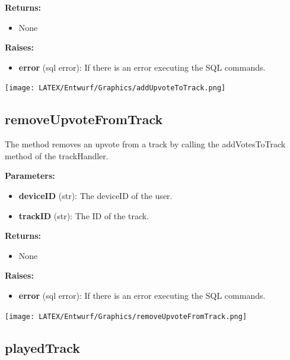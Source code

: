\documentclass[oneside, ngerman]{sdqtechreport}
\begin{document}
\textbf{Returns:}

\begin{itemize}
    \item None
\end{itemize}

\textbf{Raises:}

\begin{itemize}
    \item \textbf{error} (sql error): If there is an error executing the SQL commands.
\end{itemize}

\begin{center}
   \texttt{[image: LATEX/Entwurf/Graphics/addUpvoteToTrack.png]} 
\end{center}



\subsection*{removeUpvoteFromTrack}

The method removes an upvote from a track by calling the addVotesToTrack method of the trackHandler.

\textbf{Parameters:}

\begin{itemize}
    \item \textbf{deviceID} (str): The deviceID of the user.
    \item \textbf{trackID} (str): The ID of the track.
\end{itemize}

\textbf{Returns:}

\begin{itemize}
    \item None
\end{itemize}

\textbf{Raises:}

\begin{itemize}
    \item \textbf{error} (sql error): If there is an error executing the SQL commands.
\end{itemize}

\begin{center}
   \texttt{[image: LATEX/Entwurf/Graphics/removeUpvoteFromTrack.png]} 
\end{center}



\subsection*{playedTrack}
\end{document}
